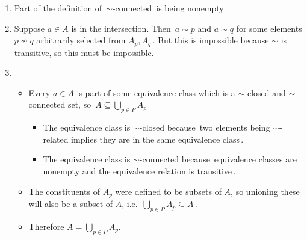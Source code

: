 \begin{enumerate}
    \item Part of the definition of \,$\sim$-connected\, is being nonempty
    \item Suppose $a \in A$ is in the intersection. Then \,$a \sim p$ and $a \sim q$ for some elements $p \not\sim q$ arbitrarily selected from $A_p, A_q$\,. But this is impossible because $\sim$ is transitive, so this must be impossible.
    \item \begin{itemize}
            \item Every $a \in A$ is part of some equivalence class which is a $\sim$-closed and $\sim$-connected set, so \,$A \subseteq \bigcup_{p \in P} A_p$\,
                  \begin{itemize}
                    \item The equivalence class is $\sim$-closed because \,two elements being $\sim$-related implies they are in the same equivalence class\,.
                    \item The equivalence class is $\sim$-connected because \,equivalence classes are nonempty and the equivalence relation is transitive\,.
                  \end{itemize}
            \item The constituents of $A_p$ were defined to be subsets of $A$, so unioning these will also be a subset of $A$, i.e. \,$\bigcup_{p \in P} A_p \subseteq A$\,.
            \item Therefore $A = \bigcup_{p \in P} A_p$.
          \end{itemize}
  \end{enumerate}